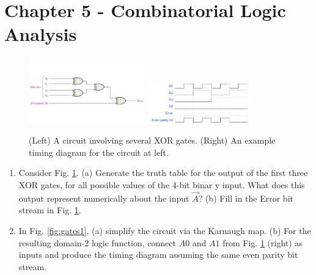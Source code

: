 \documentclass[10pt]{article}
\begin{document}
\maketitle

\section{Chapter 5 - Combinatorial Logic Analysis}
\label{sec:comb}

\begin{figure}[ht]
\centering
\includegraphics[width=0.45\textwidth,trim=0cm 4cm 0cm 4cm,clip=true]{figures/parityCheck.pdf} \hspace{0.25cm}
\includegraphics[width=0.4\textwidth]{figures/timingExample9.pdf}
\caption{\label{fig:par} (Left) A circuit involving several XOR gates. (Right) An example timing diagram for the circuit at left.}
\end{figure}

\begin{enumerate}
\item Consider Fig. \ref{fig:par}.  (a) Generate the truth table for the output of the first three XOR gates, for all possible values of the 4-bit binar	y input.  What does this output represent numerically about the input $\vec{A}$? (b) Fill in the Error bit stream in Fig. \ref{fig:par}. \\ \vspace{1cm}
\item In Fig. \ref{fig:gates1}, (a) simplify the circuit via the Karnaugh map. (b) For the resulting domain-2 logic function, connect $A0$ and $A1$ from Fig. \ref{sec:comb} (right) as inputs and produce the timing diagram assuming the same even parity bit stream.\\ \vspace{2cm}
\end{enumerate}
\end{document}

